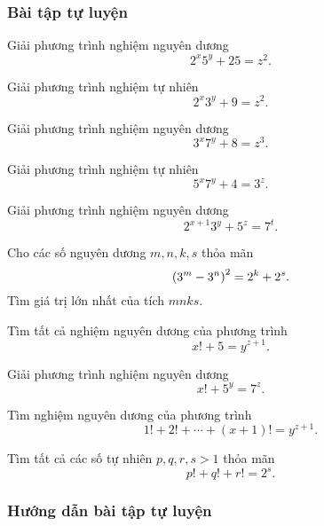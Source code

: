 \subsubsection*{Bài tập tự luyện}


\begin{btt}
Giải phương trình nghiệm nguyên dương $$2^x5^y+25=z^2.$$
\end{btt}

\begin{btt}
Giải phương trình nghiệm tự nhiên $$2^x3^y+9=z^2.$$
\end{btt}

\begin{btt}
Giải phương trình nghiệm nguyên dương $$3^x7^y+8=z^3.$$
\end{btt} 

\begin{btt}
Giải phương trình nghiệm tự nhiên $$5^x7^y+4=3^z.$$
\end{btt}

\begin{btt}
Giải phương trình nghiệm nguyên dương $$2^{x+1}3^y+5^z=7^t.$$
\end{btt}

\begin{btt}
Cho các số nguyên dương $m,n,k,s$ thỏa mãn
$$\left(\displaystyle 3^m-3^n \right)^2=2^k+2^s.$$
Tìm giá trị lớn nhất của tích $mnks.$
\end{btt}

\begin{btt}
Tìm tất cả nghiệm nguyên dương của phương trình $$x!+5=y^{z+1}.$$
\end{btt}

\begin{btt}
Giải phương trình nghiệm nguyên dương $$x!+5^y=7^z.$$
\end{btt}

\begin{btt}
Tìm nghiệm nguyên dương của phương trình 
\[1!+2!+\cdots+(x+1)!=y^{z+1}.\]
\end{btt}

\begin{btt}
Tìm tất cả các số tự nhiên $p,q,r,s>1$ thỏa mãn
$$p!+q!+r!=2^s.$$
\end{btt}

\subsubsection*{Hướng dẫn bài tập tự luyện}

